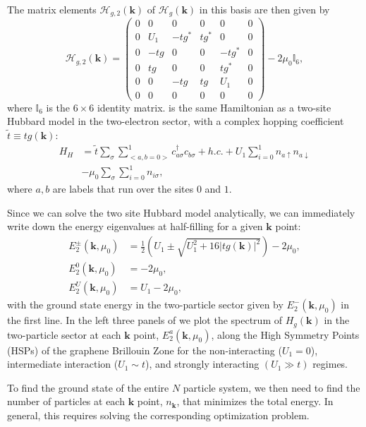 \documentclass[prb,aps,amssymb,twocolumn,notitlepage]{revtex4-2}
\begin{document}
The matrix elements $\mathcal{H}_{g,2}(\mathbf{k})$ of $\mathcal{H}_{g}(\mathbf{k})$ in this basis are then given by
\begin{equation}\label{eq:graphene2ptclham}
\mathcal{H}_{g,2}(\mathbf{k})=
\begin{pmatrix}
0&0&0&0&0&0\\
0&U_{1}&-tg^{*}&tg^{*}&0&0\\
0&-tg&0&0&-tg^*&0\\
0&tg&0&0&tg^{*}&0\\
0&0&-tg&tg&U_1&0\\
0&0&0&0&0&0
\end{pmatrix}-2\mu_0\mathbb{I}_{6},
\end{equation}
where $\mathbb{I}_6$ is the $6\times6$ identity matrix. 
 is the same Hamiltonian as a two-site Hubbard model in the two-electron sector, with a complex hopping coefficient $\tilde{t}\equiv tg(\mathbf{k})$:
\begin{align}
H_{H}&=\tilde{t}\sum_{\sigma}\sum_{<a,b=0>}^{1}c^\dagger_{a\sigma}c_{b\sigma}+h.c.+U_{1}\sum_{i=0}^{1}n_{a\uparrow}n_{a\downarrow} \nonumber \\
&-\mu_{0}\sum_{\sigma}\sum_{i=0}^{1}n_{i\sigma} ,
\end{align}
where $a,b$ are labels that run over the sites $0$ and $1$. 

Since we can solve the two site Hubbard model analytically, we can immediately write down the energy eigenvalues at half-filling for a given $\mathbf{k}$ point:
\begin{align}
\label{eq:twositeHenergies}
    E^\pm_{2}(\mathbf{k},\mu_0)&=\frac{1}{2}\left(U_{1}\pm\sqrt{U^2_{1}+16|tg(\mathbf{k})|^2}\right)-2\mu_{0},\nonumber \\
    E^0_{2}(\mathbf{k},\mu_0)&=-2\mu_{0}, \\
    E^U_{2}(\mathbf{k},\mu_0)&=U_{1}-2\mu_{0}, \nonumber
\end{align}
with the ground state energy in the two-particle sector given by $E^-_2(\mathbf{k},\mu_0)$ in the first line.
In the left three panels of  we plot the spectrum of $H_g(\mathbf{k})$ in the two-particle sector at each $\mathbf{k}$ point, $E^a_{2}(\mathbf{k},\mu_0)$, along the High Symmetry Points (HSPs) of the graphene Brillouin Zone for the non-interacting ($U_1=0$), intermediate interaction ($U_1\sim t$), and strongly interacting $(U_1\gg t)$ regimes.

To find the ground state of the entire $N$ particle system, we then need to find the number of particles at each $\mathbf{k}$ point, $n_\mathbf{k}$, that minimizes the total energy.
In general, this requires solving the corresponding optimization problem.
\end{document}
